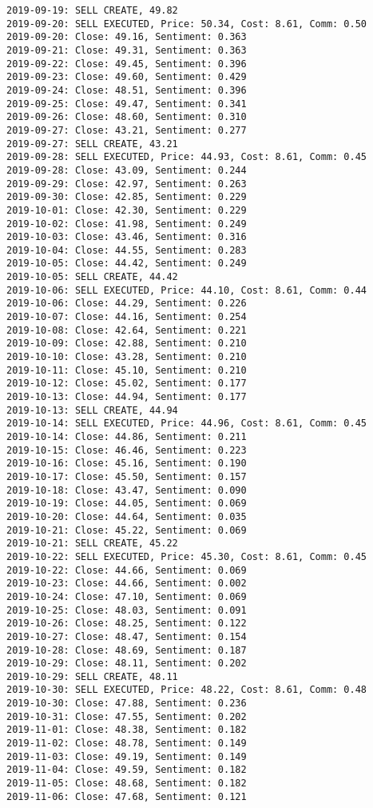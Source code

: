 \documentclass[11pt]{article}
\begin{document}
\begin{Verbatim}[commandchars=\\\{\}]
2019-09-19: SELL CREATE, 49.82
2019-09-20: SELL EXECUTED, Price: 50.34, Cost: 8.61, Comm: 0.50
2019-09-20: Close: 49.16, Sentiment: 0.363
2019-09-21: Close: 49.31, Sentiment: 0.363
2019-09-22: Close: 49.45, Sentiment: 0.396
2019-09-23: Close: 49.60, Sentiment: 0.429
2019-09-24: Close: 48.51, Sentiment: 0.396
2019-09-25: Close: 49.47, Sentiment: 0.341
2019-09-26: Close: 48.60, Sentiment: 0.310
2019-09-27: Close: 43.21, Sentiment: 0.277
2019-09-27: SELL CREATE, 43.21
2019-09-28: SELL EXECUTED, Price: 44.93, Cost: 8.61, Comm: 0.45
2019-09-28: Close: 43.09, Sentiment: 0.244
2019-09-29: Close: 42.97, Sentiment: 0.263
2019-09-30: Close: 42.85, Sentiment: 0.229
2019-10-01: Close: 42.30, Sentiment: 0.229
2019-10-02: Close: 41.98, Sentiment: 0.249
2019-10-03: Close: 43.46, Sentiment: 0.316
2019-10-04: Close: 44.55, Sentiment: 0.283
2019-10-05: Close: 44.42, Sentiment: 0.249
2019-10-05: SELL CREATE, 44.42
2019-10-06: SELL EXECUTED, Price: 44.10, Cost: 8.61, Comm: 0.44
2019-10-06: Close: 44.29, Sentiment: 0.226
2019-10-07: Close: 44.16, Sentiment: 0.254
2019-10-08: Close: 42.64, Sentiment: 0.221
2019-10-09: Close: 42.88, Sentiment: 0.210
2019-10-10: Close: 43.28, Sentiment: 0.210
2019-10-11: Close: 45.10, Sentiment: 0.210
2019-10-12: Close: 45.02, Sentiment: 0.177
2019-10-13: Close: 44.94, Sentiment: 0.177
2019-10-13: SELL CREATE, 44.94
2019-10-14: SELL EXECUTED, Price: 44.96, Cost: 8.61, Comm: 0.45
2019-10-14: Close: 44.86, Sentiment: 0.211
2019-10-15: Close: 46.46, Sentiment: 0.223
2019-10-16: Close: 45.16, Sentiment: 0.190
2019-10-17: Close: 45.50, Sentiment: 0.157
2019-10-18: Close: 43.47, Sentiment: 0.090
2019-10-19: Close: 44.05, Sentiment: 0.069
2019-10-20: Close: 44.64, Sentiment: 0.035
2019-10-21: Close: 45.22, Sentiment: 0.069
2019-10-21: SELL CREATE, 45.22
2019-10-22: SELL EXECUTED, Price: 45.30, Cost: 8.61, Comm: 0.45
2019-10-22: Close: 44.66, Sentiment: 0.069
2019-10-23: Close: 44.66, Sentiment: 0.002
2019-10-24: Close: 47.10, Sentiment: 0.069
2019-10-25: Close: 48.03, Sentiment: 0.091
2019-10-26: Close: 48.25, Sentiment: 0.122
2019-10-27: Close: 48.47, Sentiment: 0.154
2019-10-28: Close: 48.69, Sentiment: 0.187
2019-10-29: Close: 48.11, Sentiment: 0.202
2019-10-29: SELL CREATE, 48.11
2019-10-30: SELL EXECUTED, Price: 48.22, Cost: 8.61, Comm: 0.48
2019-10-30: Close: 47.88, Sentiment: 0.236
2019-10-31: Close: 47.55, Sentiment: 0.202
2019-11-01: Close: 48.38, Sentiment: 0.182
2019-11-02: Close: 48.78, Sentiment: 0.149
2019-11-03: Close: 49.19, Sentiment: 0.149
2019-11-04: Close: 49.59, Sentiment: 0.182
2019-11-05: Close: 48.68, Sentiment: 0.182
2019-11-06: Close: 47.68, Sentiment: 0.121

\end{Verbatim}
\end{document}
